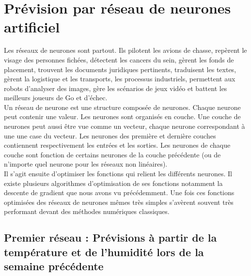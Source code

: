 \documentclass[11pt,a4paper]{article}
\begin{document}
\section {Prévision par réseau de neurones artificiel}

Les réseaux de neurones sont partout. Ils pilotent les avions de chasse, repèrent le visage des personnes fichées, détectent les cancers du sein, gèrent les fonds de placement, trouvent les documents juridiques pertinents, traduisent les textes, gèrent la logistique et les transports, les processus industriels, permettent aux robots d'analyser des images, gère les scénarios de jeux vidéo et battent les meilleurs joueurs de Go et d'échec.   \\
Un réseau de neurone est une structure composée de neurones. Chaque neurone peut contenir une valeur. Les neurones sont organisés en couche. Une couche de neurones peut aussi être vue comme un vecteur, chaque neurone correspondant à une une case du vecteur. Les neurones des première et dernière couches contiennent respectivement les entrées et les sorties. Les neurones de chaque couche sont fonction de certains neurones de la couche précédente (ou de n'importe quel neurone pour les réseaux non linéaires). \\
Il s'agit ensuite d'optimiser les fonctions qui relient les différents neurones. Il existe plusieurs algorithmes d'optimisation de ses fonctions notamment la descente de gradient que nous avons vu précédemment. Une fois ces fonctions optimisées des réseaux de neurones mêmes très simples s'avèrent souvent très performant devant des méthodes numériques classiques. \\

\subsection {Premier réseau : Prévisions à partir de la température et de l'humidité lors de la semaine précédente}
\end{document}
